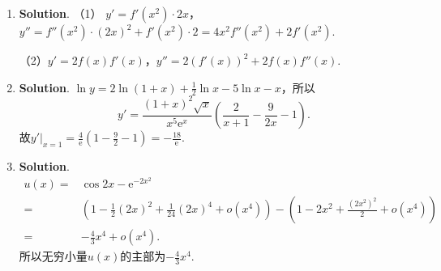 \documentclass[../main.tex]{subfiles}
\begin{document}
\begin{enumerate}
    \item \textbf{Solution}. （1） $y'=f'(x^{2})\cdot 2x$，$y''=f''(x^{2})\cdot (
              2x)^{2}+f'(x^{2})\cdot 2 = 4x^{2} f''(x^{2})+2f'(x^{2})$.

          （2）$y'=2f(x)f'(x)$，$y''=2(f'(x))^{2}+2f(x)f''(x)$.

    \item \textbf{Solution}. $\ln y = 2\ln(1+x)+\frac{1}{2}\ln x-5\ln x-x$，所以
          \[
              y' = \frac{(1+x)^{2}\sqrt{x}}{x^{5}\mathrm{e}^{x}}\left(\frac{2}{x+1}-\frac{9}{2x}
              -1\right).
          \]
          故$\left.y'\right|_{x=1}=\frac{4}{\mathrm{e}}\left(1-\frac{9}{2}-1\right)=-\frac{18}{\mathrm{e}}$.

    \item \textbf{Solution}.
          \[
              \begin{aligned}
                  u(x) = {} & \cos 2x-\mathrm{e}^{-2x^2}                                                                                          \\
                  = {}      & \left(1-\frac{1}{2}(2x)^{2}+\frac{1}{24}(2x)^{4}+o(x^{4})\right)-\left(1-2x^{2}+\frac{(2x^2)^2}{2}+o(x^{4})\right) \\
                  = {}      & -\frac{4}{3}x^{4}+o(x^{4}).
              \end{aligned}
          \]
          所以无穷小量$u(x)$的主部为$-\frac{4}{3}x^{4}$.
\end{enumerate}
\end{document}
